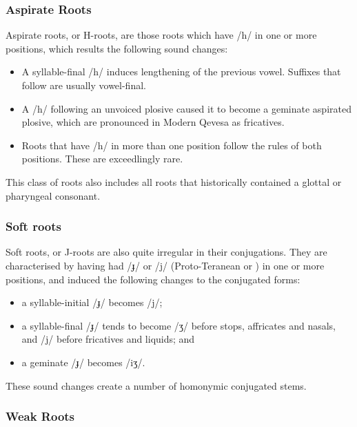 \documentclass[grammar]{subfiles}
\begin{document}
\subsubsection{Aspirate Roots}
\label{sssec:vm:aspirate_roots}

Aspirate roots, or H-roots, are those roots which have /h/ in one or more
positions, which results the following sound changes:

\begin{itemize}
  \item A syllable-final /h/ induces lengthening of the previous vowel.  Suffixes
    that follow are usually vowel-final.
  \item A /h/ following an unvoiced plosive caused it to become a geminate
    aspirated plosive, which are pronounced in Modern Qevesa as fricatives.
  \item Roots that have /h/ in more than one position follow the rules of both
    positions.  These are exceedlingly rare.
\end{itemize}

This class of roots also includes all roots that historically contained a
glottal or pharyngeal consonant.


\subsubsection{Soft roots}
\label{sssec:vm:soft_roots}

Soft roots, or J-roots are also quite irregular in their conjugations. They are
characterised by having had /ɟ/ or /j/ (Proto-Teranean  or
) in one or more positions, and induced the following changes to
the conjugated forms: 

\begin{itemize}
  \item a syllable-initial /ɟ/ becomes /j/; 
  \item a syllable-final /ɟ/ tends to become /ʒ/ before stops, affricates and
    nasals, and /j/ before fricatives and liquids; and
  \item a geminate /ɟ/ becomes /iʒ/. 
\end{itemize}

These sound changes create a number of homonymic conjugated stems. 


\subsubsection{Weak Roots}
\label{sssec:vm:weak_roots}
\end{document}
